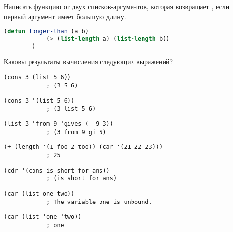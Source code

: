 \documentclass[a4paper,oneside,12pt]{extreport}
\begin{document}
\begin{task}
	Написать функцию  от двух списков-аргументов, которая возвращает , если первый аргумент имеет большую длину.

	\begin{lstlisting}[language=Lisp, gobble=16]
		(defun longer-than (a b)
			(> (list-length a) (list-length b))
		)
	\end{lstlisting}
\end{task}

\begin{task}
	Каковы результаты вычисления следующих выражений?
	\begin{AutoMultiColEnumerate}
		\item \begin{lstlisting}[style=lispinline, gobble=24]
			(cons 3 (list 5 6))
			; (3 5 6)
		\end{lstlisting}

		\item \begin{lstlisting}[style=lispinline, gobble=24]
			(cons 3 '(list 5 6))
			; (3 list 5 6)
		\end{lstlisting}

		\item \begin{lstlisting}[style=lispinline, gobble=24]
			(list 3 'from 9 'gives (- 9 3))
			; (3 from 9 gi 6)
		\end{lstlisting}

		\item \begin{lstlisting}[style=lispinline, gobble=24]
			(+ (length '(1 foo 2 too)) (car '(21 22 23)))
			; 25
		\end{lstlisting}

		\item \begin{lstlisting}[style=lispinline, gobble=24]
			(cdr '(cons is short for ans))
			; (is short for ans)
		\end{lstlisting}

		\item \begin{lstlisting}[style=lispinline, gobble=24]
			(car (list one two))
			; The variable one is unbound.
		\end{lstlisting}

		\item \begin{lstlisting}[style=lispinline, gobble=24]
			(car (list 'one 'two))
			; one
		\end{lstlisting}
	\end{AutoMultiColEnumerate}
\end{task}
\end{document}
